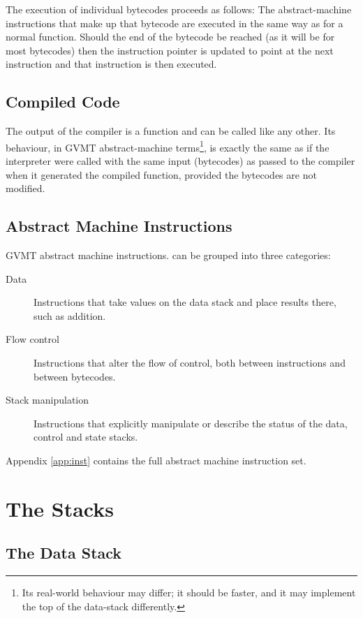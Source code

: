 The execution of individual bytecodes proceeds as follows: The abstract-machine instructions that make up that bytecode are executed in the same way as for a normal function. Should the end of the bytecode be reached (as it will be for most bytecodes) then the instruction pointer is updated to point at the next instruction and that instruction is then executed.

\subsection{Compiled Code}

The output of the compiler is a function and can be called like any other. Its behaviour, in GVMT abstract-machine 
terms\footnote{Its real-world behaviour may differ; it should be faster, and it may implement the top of the data-stack differently.}, 
is exactly the same as if the interpreter were called with the same input (bytecodes) as passed to the compiler when it generated the compiled function, provided the bytecodes are not modified.

\subsection{Abstract Machine Instructions}

GVMT abstract machine instructions. can be grouped into three categories:
\begin{description}
\item[Data] Instructions that take values on the data stack and place results there, such as addition.
\item[Flow control] Instructions that alter the flow of control, both between instructions and between bytecodes.
\item[Stack manipulation] Instructions that explicitly manipulate or describe the status of the data, control and state stacks.
\end{description}

Appendix \ref{app:inst} contains the full abstract machine instruction set.

\section{The Stacks}

\subsection{The Data Stack}

